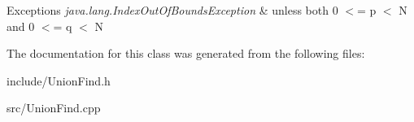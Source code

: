 \begin{DoxyExceptions}{Exceptions}
{\em java.\+lang.\+Index\+Out\+Of\+Bounds\+Exception} & unless both 0 $<$= p $<$ N and 0 $<$= q $<$ N \\
\hline
\end{DoxyExceptions}


The documentation for this class was generated from the following files\+:\begin{DoxyCompactItemize}
\item 
include/Union\+Find.\+h\item 
src/Union\+Find.\+cpp\end{DoxyCompactItemize}
